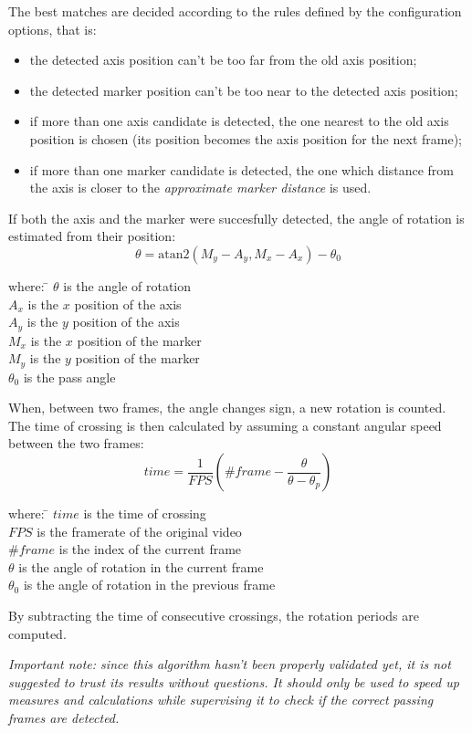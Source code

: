 \beforelist* The best matches are decided according to the rules defined by the configuration options, that is:
\begin{itemize}
  \item the detected axis position can't be too far from the old axis position;
  \item the detected marker position can't be too near to the detected axis
    position;
  \item if more than one axis candidate is detected, the one nearest to the old
    axis position is chosen (its position becomes the axis position for the next
    frame);
  \item if more than one marker candidate is detected, the one which distance
    from the axis is closer to the \emph{approximate marker distance} is used.
\end{itemize}
\afterlist*
If both the axis and the marker were succesfully detected, the angle of rotation
is estimated from their position:
\[
  \theta = \mathrm{atan2}\left( M_y-A_y, M_x-A_x \right) - \theta_0
\]
\begin{tabbing}
where:  \= $\theta$ is the angle of rotation \\
        \> $A_x$ is the $x$ position of the axis \\
        \> $A_y$ is the $y$ position of the axis \\
        \> $M_x$ is the $x$ position of the marker \\
        \> $M_y$ is the $y$ position of the marker \\
        \> $\theta_0$ is the pass angle
\end{tabbing}

When, between two frames, the angle changes sign, a new rotation is counted.
The time of crossing is then calculated by assuming a constant angular speed
between the two frames:
\[
  time = \frac{1}{FPS}\left( \#frame - \frac{\theta}{\theta - \theta_p} \right)
\]
\begin{tabbing}
where:  \= $time$ is the time of crossing \\
        \> $FPS$ is the framerate of the original video \\
        \> $\#frame$ is the index of the current frame \\
        \> $\theta$ is the angle of rotation in the current frame \\
        \> $\theta_0$ is the angle of rotation in the previous frame 
\end{tabbing}
By subtracting the time of consecutive crossings, the rotation periods are
computed.

\textit{Important note: since this algorithm hasn't been properly validated yet,
it is not suggested to trust its results without questions. It should only be
used to speed up measures and calculations while supervising it to check if the
correct passing frames are detected.}
